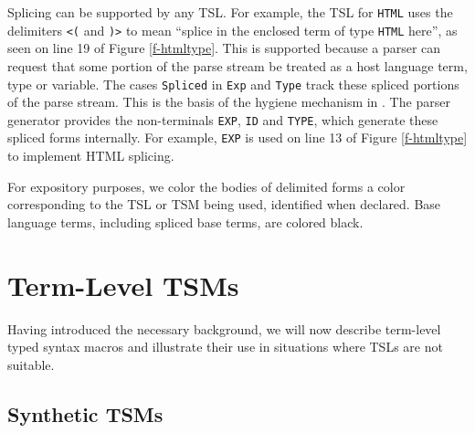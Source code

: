 \documentclass{sig-alternate}[10pt]
\newcommand{\lstinlinew}[1]{\lstinline[style=wyvern]{#1}}
\begin{document}
Splicing can be supported by any TSL. For example, the TSL for \lstinlinew{HTML} uses the delimiters \lstinlinew{<(} and \lstinlinew{)>} to mean ``splice in the enclosed term  of type \lstinlinew{HTML} here'', as seen on line 19 of Figure \ref{f-htmltype}. This is supported because a parser can request that some portion of the parse stream be treated as a host language term, type or variable. The cases \lstinlinew{Spliced} in \lstinlinew{Exp} and \lstinlinew{Type} track these spliced portions of the parse stream. This is the basis of the hygiene mechanism in \cite{TSLs}. The parser generator provides the non-terminals \lstinlinew{EXP}, \lstinlinew{ID} and \lstinlinew{TYPE}, which generate these spliced forms internally. For example, \lstinlinew{EXP} is used on line 13 of Figure \ref{f-htmltype} to implement HTML splicing.%

For expository purposes, we color the bodies of delimited forms a color corresponding to the TSL or TSM being used, identified when declared. Base language terms, including spliced base terms, are colored black. 

\section{Term-Level TSM\lowercase{s}}\label{tsms-term}
Having introduced the necessary background, we will now describe term-level typed syntax macros  and illustrate their use in situations where TSLs are not suitable. %


\subsection{Synthetic TSMs}
\end{document}
